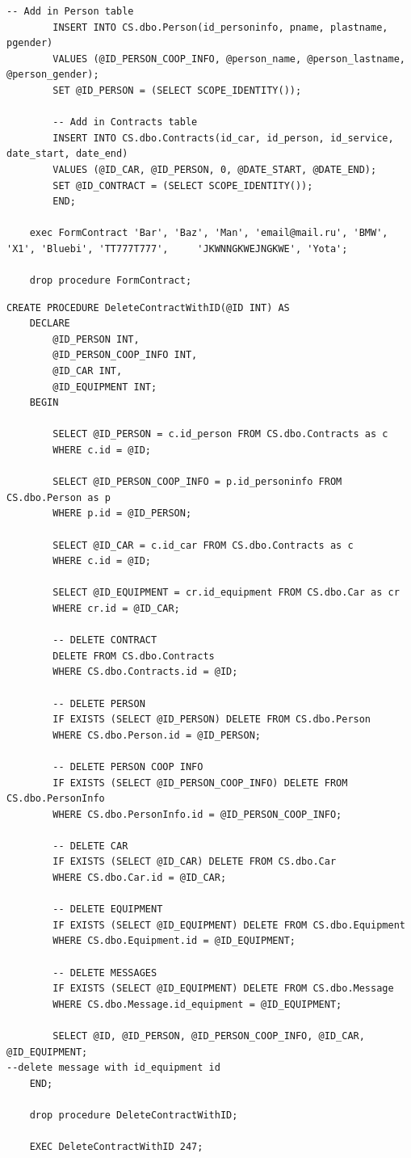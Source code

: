 \begin{lstlisting}[caption=Процедура для формирования нового контракта с проставлением всех зависимостей, label = list:FormContract]
		-- Add in Person table
		INSERT INTO CS.dbo.Person(id_personinfo, pname, plastname, pgender)
		VALUES (@ID_PERSON_COOP_INFO, @person_name, @person_lastname, @person_gender);
		SET @ID_PERSON = (SELECT SCOPE_IDENTITY());

		-- Add in Contracts table
		INSERT INTO CS.dbo.Contracts(id_car, id_person, id_service, date_start, date_end)
		VALUES (@ID_CAR, @ID_PERSON, 0, @DATE_START, @DATE_END);
		SET @ID_CONTRACT = (SELECT SCOPE_IDENTITY());
		END;

	exec FormContract 'Bar', 'Baz', 'Man', 'email@mail.ru', 'BMW', 'X1', 'Bluebi', 'TT777T777', 	'JKWNNGKWEJNGKWE', 'Yota';
	
	drop procedure FormContract;

\end{lstlisting}

\begin{lstlisting}[caption=Процедура для удаления контрака\, с удалением всех необходимых зависимостей для вывода полной информации по пользователям, label = list:DeleteContractWithID]
	CREATE PROCEDURE DeleteContractWithID(@ID INT) AS
	DECLARE 
		@ID_PERSON INT,
		@ID_PERSON_COOP_INFO INT,
		@ID_CAR INT,
		@ID_EQUIPMENT INT;
	BEGIN

		SELECT @ID_PERSON = c.id_person FROM CS.dbo.Contracts as c
		WHERE c.id = @ID;

		SELECT @ID_PERSON_COOP_INFO = p.id_personinfo FROM CS.dbo.Person as p
		WHERE p.id = @ID_PERSON;

		SELECT @ID_CAR = c.id_car FROM CS.dbo.Contracts as c
		WHERE c.id = @ID;

		SELECT @ID_EQUIPMENT = cr.id_equipment FROM CS.dbo.Car as cr
		WHERE cr.id = @ID_CAR;

		-- DELETE CONTRACT
		DELETE FROM CS.dbo.Contracts
		WHERE CS.dbo.Contracts.id = @ID;

		-- DELETE PERSON
		IF EXISTS (SELECT @ID_PERSON) DELETE FROM CS.dbo.Person
		WHERE CS.dbo.Person.id = @ID_PERSON;

		-- DELETE PERSON COOP INFO
		IF EXISTS (SELECT @ID_PERSON_COOP_INFO) DELETE FROM CS.dbo.PersonInfo
		WHERE CS.dbo.PersonInfo.id = @ID_PERSON_COOP_INFO;

		-- DELETE CAR
		IF EXISTS (SELECT @ID_CAR) DELETE FROM CS.dbo.Car
		WHERE CS.dbo.Car.id = @ID_CAR;

		-- DELETE EQUIPMENT
		IF EXISTS (SELECT @ID_EQUIPMENT) DELETE FROM CS.dbo.Equipment
		WHERE CS.dbo.Equipment.id = @ID_EQUIPMENT;

		-- DELETE MESSAGES
		IF EXISTS (SELECT @ID_EQUIPMENT) DELETE FROM CS.dbo.Message
		WHERE CS.dbo.Message.id_equipment = @ID_EQUIPMENT;

		SELECT @ID, @ID_PERSON, @ID_PERSON_COOP_INFO, @ID_CAR, @ID_EQUIPMENT;
--delete message with id_equipment id
	END;

	drop procedure DeleteContractWithID;

	EXEC DeleteContractWithID 247;
\end{lstlisting}

